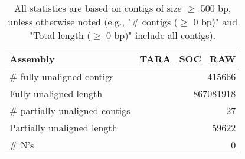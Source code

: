 \documentclass[12pt,a4paper]{article}
\begin{document}
\begin{table}[ht]
\begin{center}
\caption{All statistics are based on contigs of size $\geq$ 500 bp, unless otherwise noted (e.g., "\# contigs ($\geq$ 0 bp)" and "Total length ($\geq$ 0 bp)" include all contigs).}
\begin{tabular}{|l*{1}{|r}|}
\hline
Assembly & TARA\_SOC\_RAW \\ \hline
\# fully unaligned contigs & 415666 \\ \hline
Fully unaligned length & 867081918 \\ \hline
\# partially unaligned contigs & 27 \\ \hline
Partially unaligned length & 59622 \\ \hline
\# N's & 0 \\ \hline
\end{tabular}
\end{center}
\end{table}
\end{document}
